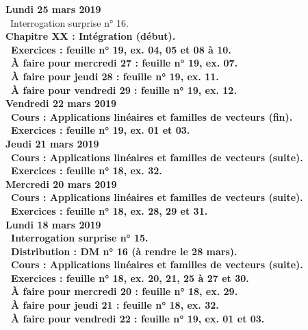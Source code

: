 \documentclass[12pt,a4paper]{article}
\begin{document}
\noindent\textbf{\bf Lundi 25 mars 2019} \\
\bu\ Interrogation surprise n° 16.\\
\bf Chapitre XX \rm : Intégration (début).\vspace{.4cm}\\
\bu\ Exercices : feuille n° 19, ex. 04, 05 et 08 à 10.\\
\bu\ À faire pour mercredi 27 : feuille n° 19, ex. 07.\\
\bu\ À faire pour jeudi 28 : feuille n° 19, ex. 11.\\
\bu\ À faire pour vendredi 29 : feuille n° 19, ex. 12.\vspace{.4cm}\\

\noindent\textbf{\bf Vendredi 22 mars 2019} \\
\bu\ Cours : Applications linéaires et familles de vecteurs (fin).\\
\bu\ Exercices : feuille n° 19, ex. 01 et 03.\vspace{.4cm}\\

\noindent\textbf{Jeudi 21 mars 2019}\\
\bu\ Cours : Applications linéaires et familles de vecteurs (suite).\\
\bu\ Exercices : feuille n° 18, ex. 32.\vspace{.4cm}\\

\noindent\textbf{Mercredi 20 mars 2019} \\
\bu\ Cours : Applications linéaires et familles de vecteurs (suite).\\
\bu\ Exercices : feuille n° 18, ex. 28, 29 et 31.\vspace{.4cm}\\

\noindent\textbf{\bf Lundi 18 mars 2019} \\
\bu\ Interrogation surprise n° 15.\\
\bu\ Distribution : DM n° 16 (à rendre le 28 mars).\\
\bu\ Cours : Applications linéaires et familles de vecteurs (suite).\\
\bu\ Exercices : feuille n° 18, ex. 20, 21, 25 à 27 et 30.\\
\bu\ À faire pour mercredi 20 : feuille n° 18, ex. 29.\\
\bu\ À faire pour jeudi 21 : feuille n° 18, ex. 32.\\
\bu\ À faire pour vendredi 22 : feuille n° 19, ex. 01 et 03.\vspace{.4cm}\\
\end{document}
